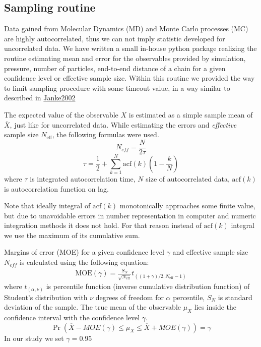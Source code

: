 \documentclass[journal=mamobx, layout=twocolumns,manuscript=article]{achemso}
\begin{document}
\subsection{Sampling routine}
Data gained from Molecular Dynamics (MD) and Monte Carlo processes (MC) are highly autocorrelated, thus we can not imply statistic developed for uncorrelated data. 
We have written a small in-house python package realizing the routine estimating mean and error for the observables provided by simulation, \ie pressure, number of particles, end-to-end distance of a chain for a given confidence level or effective sample size. 
Within this routine we provided the way to limit sampling procedure with some timeout value, in a way similar to described in \href{https://www.physik.uni-leipzig.de/~janke/Paper/nic10_423_2002.pdf}{Janke2002}

The expected value of the observable $X$ is estimated as a simple sample mean of $\overline{X}$, just like for uncorrelated data. While estimating the errors and \emph{effective} sample size $N_{\text{eff}}$, the following formulas were used.
\begin{equation}
    N_{eff} = \frac{N}{2\tau}
\end{equation}    
\begin{equation}
    \tau  = \frac{1}{2} + \sum_{k=1}^{N} \text{acf} (k) (1-\frac{k}{N})
\end{equation}
where $\tau$ is integrated autocorrelation time, $N$ size of autocorrelated data, $\text{acf} (k)$ is autocorrelation function on lag.

Note that ideally integral of  $\text{acf} (k)$ monotonically approaches some finite value, but due to unavoidable errors in number representation in computer and numeric integration methods it does not hold. 
For that reason instead of $\text{acf} (k)$ integral we use the maximum of its cumulative sum.

Margins of error (MOE) for a given confidence level $\gamma$ and effective sample size $N_{eff}$ is calculated using the following equation:
\begin{eqnarray}
    \text{MOE}(\gamma) = \frac{S_{N}}{\sqrt{N_{\text{eff}}}} t_{((1+\gamma)/2, N_{\text{eff}}-1)}
\end{eqnarray}
where $t_{(\alpha, \nu)}$ is percentile function (inverse cumulative distribution function) of Student’s distribution with $\nu$ degrees of freedom for $\alpha$ percentile,
$S_N$ is standard deviation of the sample.
The true mean of the observable $\mu_X$ lies inside the confidence interval with the confidence level $\gamma$.
\begin{equation}
    \Pr(\overline{X} - MOE(\gamma) \leq \mu_X \leq \overline{X} + MOE(\gamma)) = \gamma
\end{equation}
In our study we set $\gamma = 0.95$
\end{document}
